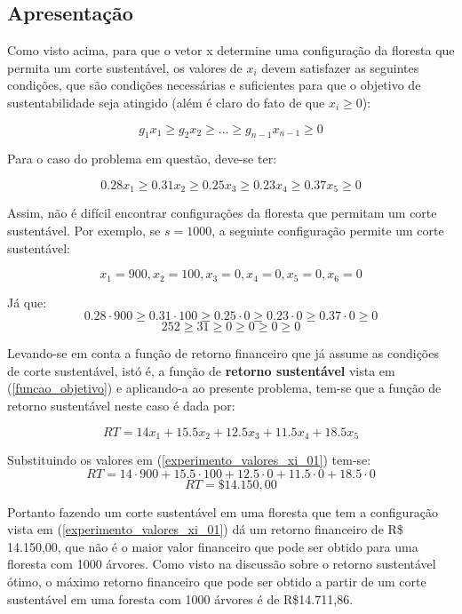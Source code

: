 \documentclass[a4paper, 12pt]{article}
\begin{document}
\subsection{Apresentação}

Como visto acima, para que o vetor x determine uma configuração da floresta que permita um corte sustentável, os valores de $x_i$ devem satisfazer as seguintes condições, que são condições necessárias e suficientes para que o objetivo de sustentabilidade seja atingido (além é claro do fato de que $x_i\ge 0$):

$$g_1x_1\ge g_2x_2\ge ...\ge g_{n-1}x_{n-1}\ge 0$$

Para o caso do problema em questão, deve-se ter:

\begin{equation}\label{experimento_desigualdades_sustentaveis}
    0.28x_1\ge 0.31x_2\ge 0.25x_3\ge 0.23x_4\ge 0.37x_5 \ge 0
\end{equation}

Assim, não é difícil encontrar configurações da floresta que permitam um corte sustentável. Por exemplo, se $s=1000$, a seguinte configuração permite um corte sustentável:

\begin{equation}\label{experimento_valores_xi_01}
    x_1=900, x_2=100, x_3=0, x_4=0, x_5=0, x_6=0
\end{equation}

Já que: 
$$0.28\cdot 900\ge 0.31\cdot 100\ge 0.25\cdot 0\ge 0.23\cdot 0\ge 0.37\cdot 0 \ge 0$$
$$252\ge 31\ge 0\ge 0\ge 0\ge 0$$

Levando-se em conta a função de retorno financeiro que já assume as condições de corte sustentável, istó é, a função de \textbf{retorno sustentável} vista em (\ref{funcao_objetivo}) e aplicando-a ao presente problema, tem-se que a função de retorno sustentável neste caso é dada por:

\begin{equation}\label{RT_experimento}
    RT=14x_1+15.5x_2+12.5x_3+11.5x_4+18.5x_5
\end{equation}

Substituindo os valores em (\ref{experimento_valores_xi_01}) tem-se:
$$RT=14\cdot 900+15.5\cdot 100+12.5\cdot 0+11.5\cdot 0+18.5\cdot 0$$
$$RT=\$ 14.150,00$$

Portanto fazendo um corte sustentável em uma floresta que tem a configuração vista em (\ref{experimento_valores_xi_01}) dá um retorno financeiro de R\$ 14.150,00, que não é o maior valor financeiro que pode ser obtido para uma floresta com 1000 árvores. Como visto na discussão sobre o retorno sustentável ótimo, o máximo retorno financeiro que pode ser obtido a partir de um corte sustentável em uma foresta com 1000 árvores é de R\$14.711,86. 
\end{document}
